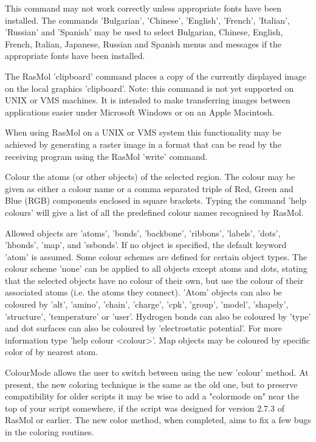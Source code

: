 This command may not work correctly unless appropriate fonts
have been installed.  The commands
'Bulgarian',
'Chinese',
'English',
'French',
'Italian',
'Russian'
and
'Spanish'
may be used to select Bulgarian, Chinese, English, French,
Italian, Japanese, Russian and Spanish menus and messages if the
appropriate fonts have been installed.

The RasMol
'clipboard'
command places a copy of the currently displayed image on the local
graphics 'clipboard'. Note: this command is not yet supported on
UNIX or VMS machines. It is intended to make transferring images
between applications easier under Microsoft Windows or on an Apple
Macintosh.

When using RasMol on a UNIX or VMS system this functionality may be
achieved by generating a raster image in a format that can be read
by the receiving program using the RasMol
'write'
command.

Colour the atoms (or other objects) of the selected region. The colour may
be given as either a colour name or a comma separated triple of Red, Green
and Blue (RGB) components enclosed in square brackets. Typing the command
'help colours'
will give a list of all the predefined colour names recognised
by RasMol.

Allowed objects are
'atoms',
'bonds',
'backbone',
'ribbons',
'labels',
'dots',
'hbonds',
'map',
and
'ssbonds'.
If no object is specified, the default keyword
'atom'
is assumed.
Some colour schemes are defined for certain object types. The colour scheme
'none'
can be applied to all objects except atoms and dots, stating that the selected
objects have no colour of their own, but use the colour of their associated
atoms (i.e. the atoms they connect).
'Atom'
objects can also be coloured by
'alt',
'amino',
'chain',
'charge',
'cpk',
'group',
'model',
'shapely',
'structure',
'temperature'
or
'user'.
Hydrogen bonds can also be coloured by
'type'
and dot surfaces can also be coloured by
'electrostatic potential'.
For more information type
'help colour <colour>'.
Map objects may be coloured by specific color of by nearest atom.

ColourMode allows the user to switch between using the new
'colour'
method. At present, the new coloring technique is the same as
the old one, but to preserve compatibility for older scripts
it may be wise to add a "colormode on" near the top of your
script somewhere, if the script was designed for version 2.7.3
of RasMol or earlier. The new color method, when completed,
aims to fix a few bugs in the coloring routines.

